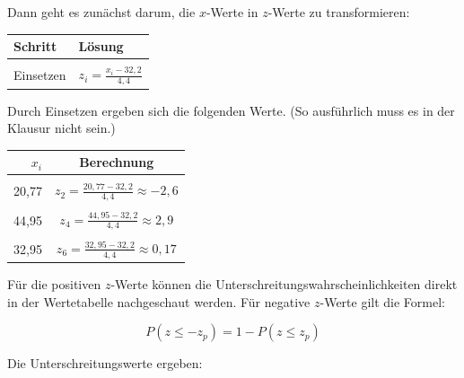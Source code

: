 \documentclass[
  11pt,
  ngerman,
  a4paper,
]{report}
\begin{document}
Dann geht es zunächst darum, die \(x\)-Werte in \(z\)-Werte zu transformieren:

\begin{table}[H]
\centering
\begin{tabular}{l>{\centering\arraybackslash}p{8cm}}
\toprule
\textbf{Schritt} & \textbf{Lösung}\\
\midrule
\cellcolor{gray!6}{Formel} & \cellcolor{gray!6}{$z_{i} = \frac{x_{i} - \mu}{\sigma}$}\\
Einsetzen & $z_{i} = \frac{x_{i} - 32{,}2}{4{,}4}$\\
\bottomrule
\end{tabular}
\end{table}

Durch Einsetzen ergeben sich die folgenden Werte. (So ausführlich muss es in der Klausur nicht sein.)

\begin{table}[H]
\centering
\begin{tabular}{rc}
\toprule
\textbf{$x_i$} & \textbf{Berechnung}\\
\midrule
\cellcolor{gray!6}{40,63} & \cellcolor{gray!6}{$z_{1}=\frac{40{,}63-32{,}2}{4{,}4}\approx1{,}92$}\\
20,77 & $z_{2}=\frac{20{,}77-32{,}2}{4{,}4}\approx-2{,}6$\\
\cellcolor{gray!6}{33,41} & \cellcolor{gray!6}{$z_{3}=\frac{33{,}41-32{,}2}{4{,}4}\approx0{,}27$}\\
44,95 & $z_{4}=\frac{44{,}95-32{,}2}{4{,}4}\approx2{,}9$\\
\cellcolor{gray!6}{41,91} & \cellcolor{gray!6}{$z_{5}=\frac{41{,}91-32{,}2}{4{,}4}\approx2{,}21$}\\
32,95 & $z_{6}=\frac{32{,}95-32{,}2}{4{,}4}\approx0{,}17$\\
\bottomrule
\end{tabular}
\end{table}

Für die positiven \(z\)-Werte können die Unterschreitungs­wahrscheinlichkeiten direkt in der Wertetabelle nachgeschaut werden. Für negative \(z\)-Werte gilt die Formel:

\[ P(z\leq -z_p) = 1-P(z \leq z_p) \]

Die Unterschreitungswerte ergeben:
\end{document}
